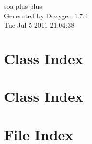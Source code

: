 \documentclass[a4paper]{book}
\begin{document}
\hypersetup{pageanchor=false}
\begin{titlepage}
\vspace*{7cm}
\begin{center}
{\Large soa-\/plus-\/plus }\\
\vspace*{1cm}
{\large Generated by Doxygen 1.7.4}\\
\vspace*{0.5cm}
{\small Tue Jul 5 2011 21:04:38}\\
\end{center}
\end{titlepage}
\clearemptydoublepage
{}
\tableofcontents
\clearemptydoublepage
{}
\hypersetup{pageanchor=true}
\chapter{Class Index}

\chapter{Class Index}

\chapter{File Index}

\end{document}

